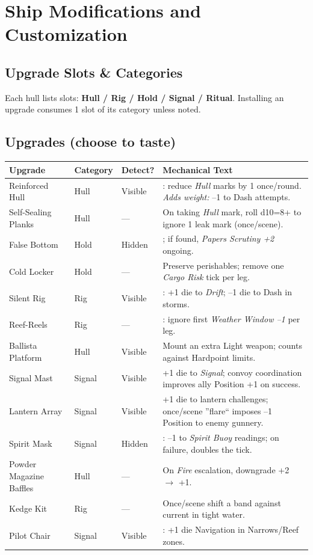 \documentclass[11pt,oneside]{book}
\newcommand{\tagpill}[1]{\begingroup
  \setlength{\fboxsep}{1pt}\color{black}\fbox{\footnotesize\textsf{#1}}
\endgroup}
\begin{document}
\section{Ship Modifications and Customization}

\subsection*{Upgrade Slots \& Categories}
Each hull lists slots: \textbf{Hull / Rig / Hold / Signal / Ritual}. Installing an upgrade consumes 1 slot of its category unless noted.

\subsection*{Upgrades (choose to taste)}
\begin{tabularx}{\linewidth}{@{}p{3.4cm} p{1.7cm} p{1.7cm} X@{}}
\toprule
\textbf{Upgrade} & \textbf{Category} & \textbf{Detect?} & \textbf{Mechanical Text}\\
\midrule
Reinforced Hull & Hull & Visible & \tagpill{ARMORED}: reduce \textit{Hull} marks by 1 once/round. \emph{Adds weight:} --1 to Dash attempts.\\
Self-Sealing Planks & Hull & --- & On taking \textit{Hull} mark, roll d10=8+ to ignore 1 leak mark (once/scene).\\
False Bottom & Hold & Hidden & \tagpill{HIDDEN HOLD +1}; if found, \textit{Papers Scrutiny +2} ongoing.\\
Cold Locker & Hold & --- & Preserve perishables; remove one \textit{Cargo Risk} tick per leg.\\
Silent Rig & Rig & Visible & \tagpill{SILENT RIG}: +1 die to \emph{Drift}; --1 die to Dash in storms.\\
Reef-Reels & Rig & --- & \tagpill{REEF FAST}: ignore first \textit{Weather Window --1} per leg.\\
Ballista Platform & Hull & Visible & Mount an extra Light weapon; counts against Hardpoint limits.\\
Signal Mast & Signal & Visible & +1 die to \emph{Signal}; convoy coordination improves ally Position +1 on success.\\
Lantern Array & Signal & Visible & +1 die to lantern challenges; once/scene ''flare`` imposes --1 Position to enemy gunnery.\\
Spirit Mask & Signal & Hidden & \tagpill{VEIL}: --1 to \textit{Spirit Buoy} readings; on failure, doubles the tick.\\
Powder Magazine Baffles & Hull & --- & On \textit{Fire} escalation, downgrade +2 $\rightarrow$ +1.\\
Kedge Kit & Rig & --- & Once/scene shift a band against current in tight water.\\
Pilot Chair & Signal & Visible & \tagpill{NAV CHAIR}: +1 die Navigation in Narrows/Reef zones.\\
\bottomrule
\end{tabularx}
\end{document}
